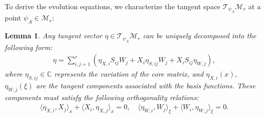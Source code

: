 \documentclass[preprint,11pt]{elsarticle}
\newtheorem{lemma}{Lemma}[section]
\begin{document}
To derive the evolution equations, we characterize the tangent space $\mathcal{T}_{\psi_A}\mathcal{M}_r$ at a point $\psi_A \in \mathcal{M}_r$:
\begin{lemma}\label{lemma: tangent space of M_r at psi_A} 
    Any tangent vector $\eta \in \mathcal{T}_{\psi_A}\mathcal{M}_r$ can be uniquely decomposed into the following form:
    \begin{align*}
        \eta = \sum_{i,j=1}^{r} \left( \eta_{X,i} S_{ij} W_j + X_i \eta_{S,ij} W_j + X_i S_{ij} \eta_{W,j} \right),
    \end{align*}  
    where $\eta_{S,ij} \in \mathbb{C}$ represents the variation of the core matrix, and $\eta_{X,i}(x)$, $\eta_{W,j}(\xi)$ are the tangent components associated with the basis functions. These components must satisfy the following orthogonality relations:
    \begin{align}\label{eq: derivative of orthogonality}
        \langle \eta_{X,i}, X_j \rangle_{x} + \langle X_i, \eta_{X,j} \rangle_{x} = 0, \quad \langle \eta_{W,i}, W_j \rangle_{\xi} + \langle W_i, \eta_{W,j} \rangle_{\xi} = 0.
    \end{align}
\end{lemma}




\end{document}
